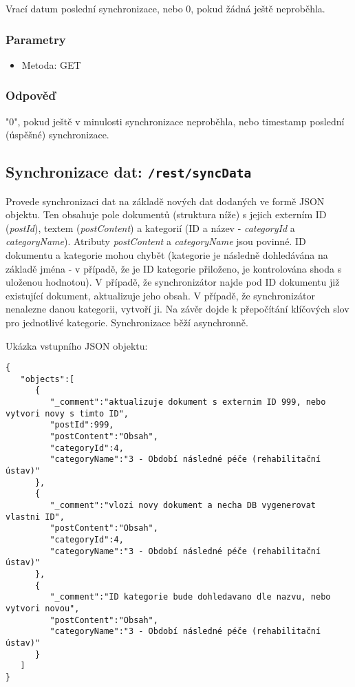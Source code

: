 \documentclass{article}
\begin{document}
Vrací datum poslední synchronizace, nebo 0, pokud žádná ještě neproběhla.

\subsubsection{Parametry}

\begin{itemize}
	\item Metoda: GET
\end{itemize}

\subsubsection{Odpověď}

"0", pokud ještě v minulosti synchronizace neproběhla, nebo timestamp poslední (úspěšné) synchronizace.

\subsection{Synchronizace dat: \texttt{/rest/syncData}}

Provede synchronizaci dat na základě nových dat dodaných ve formě JSON objektu. Ten obsahuje pole dokumentů (struktura níže) s jejich externím ID (\textit{postId}), textem (\textit{postContent}) a kategorií (ID a název - \textit{categoryId} a \textit{categoryName}). Atributy \textit{postContent} a \textit{categoryName} jsou povinné. ID dokumentu a kategorie mohou chybět (kategorie je následně dohledávána na základě jména - v případě, že je ID kategorie přiloženo, je kontrolována shoda s uloženou hodnotou). V případě, že synchronizátor najde pod ID dokumentu již existující dokument, aktualizuje jeho obsah. V případě, že synchronizátor nenalezne danou kategorii, vytvoří ji. Na závěr dojde k přepočítání klíčových slov pro jednotlivé kategorie. Synchronizace běží asynchronně.

Ukázka vstupního JSON objektu:

\begin{verbatim}
{
   "objects":[
      {
         "_comment":"aktualizuje dokument s externim ID 999, nebo vytvori novy s timto ID",
         "postId":999,
         "postContent":"Obsah",
         "categoryId":4,
         "categoryName":"3 - Období následné péče (rehabilitační ústav)"
      },
      {
         "_comment":"vlozi novy dokument a necha DB vygenerovat vlastni ID",
         "postContent":"Obsah",
         "categoryId":4,
         "categoryName":"3 - Období následné péče (rehabilitační ústav)"
      },
      {
         "_comment":"ID kategorie bude dohledavano dle nazvu, nebo vytvori novou",
         "postContent":"Obsah",
         "categoryName":"3 - Období následné péče (rehabilitační ústav)"
      }
   ]
}
\end{verbatim}
\end{document}
